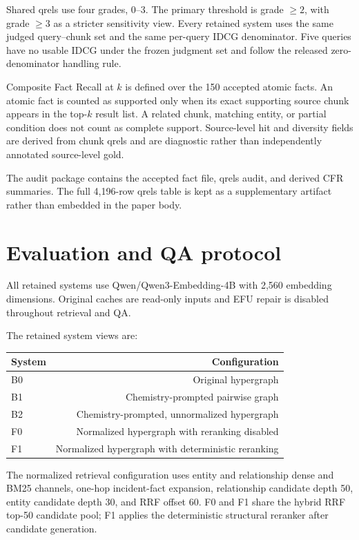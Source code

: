 Shared qrels use four grades, 0--3. The primary threshold is grade $\geq 2$, with grade $\geq 3$ as a stricter sensitivity view. Every retained system uses the same judged query--chunk set and the same per-query IDCG denominator. Five queries have no usable IDCG under the frozen judgment set and follow the released zero-denominator handling rule.

Composite Fact Recall at $k$ is defined over the 150 accepted atomic facts. An atomic fact is counted as supported only when its exact supporting source chunk appears in the top-$k$ result list. A related chunk, matching entity, or partial condition does not count as complete support. Source-level hit and diversity fields are derived from chunk qrels and are diagnostic rather than independently annotated source-level gold.

The audit package contains the accepted fact file, qrels audit, and derived CFR summaries. The full 4,196-row qrels table is kept as a supplementary artifact rather than embedded in the paper body.

\section{Evaluation and QA protocol}

All retained systems use Qwen/Qwen3-Embedding-4B with 2,560 embedding dimensions. Original caches are read-only inputs and EFU repair is disabled throughout retrieval and QA.

The retained system views are:

\begin{table}[t]
\centering
\small
\begin{tabularx}{\linewidth}{Xr}
\toprule
System & Configuration \\
\midrule
B0 & Original hypergraph \\
B1 & Chemistry-prompted pairwise graph \\
B2 & Chemistry-prompted, unnormalized hypergraph \\
F0 & Normalized hypergraph with reranking disabled \\
F1 & Normalized hypergraph with deterministic reranking \\
\bottomrule
\end{tabularx}
\end{table}

The normalized retrieval configuration uses entity and relationship dense and BM25 channels, one-hop incident-fact expansion, relationship candidate depth 50, entity candidate depth 30, and RRF offset 60. F0 and F1 share the hybrid RRF top-50 candidate pool; F1 applies the deterministic structural reranker after candidate generation.

